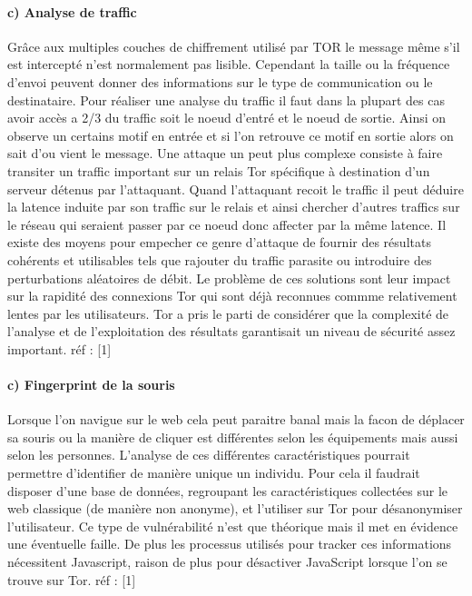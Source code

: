 \documentclass[]{article}
\let\oldparagraph\paragraph
\renewcommand{\paragraph}[1]{\oldparagraph{#1}\mbox{}}
\begin{document}
\paragraph{c) Analyse de traffic}\label{c-analyse-de-traffic}

Grâce aux multiples couches de chiffrement utilisé par TOR le message
même s'il est intercepté n'est normalement pas lisible. Cependant la
taille ou la fréquence d'envoi peuvent donner des informations sur le
type de communication ou le destinataire. Pour réaliser une analyse du
traffic il faut dans la plupart des cas avoir accès a 2/3 du traffic
soit le noeud d'entré et le noeud de sortie. Ainsi on observe un
certains motif en entrée et si l'on retrouve ce motif en sortie alors on
sait d'ou vient le message. Une attaque un peut plus complexe consiste à
faire transiter un traffic important sur un relais Tor spécifique à
destination d'un serveur détenus par l'attaquant. Quand l'attaquant
recoit le traffic il peut déduire la latence induite par son traffic sur
le relais et ainsi chercher d'autres traffics sur le réseau qui seraient
passer par ce noeud donc affecter par la même latence. Il existe des
moyens pour empecher ce genre d'attaque de fournir des résultats
cohérents et utilisables tels que rajouter du traffic parasite ou
introduire des perturbations aléatoires de débit. Le problème de ces
solutions sont leur impact sur la rapidité des connexions Tor qui sont
déjà reconnues commme relativement lentes par les utilisateurs. Tor a
pris le parti de considérer que la complexité de l'analyse et de
l'exploitation des résultats garantisait un niveau de sécurité assez
important. réf : {[}1{]}

\paragraph{c) Fingerprint de la
souris}\label{c-fingerprint-de-la-souris}

Lorsque l'on navigue sur le web cela peut paraitre banal mais la facon
de déplacer sa souris ou la manière de cliquer est différentes selon les
équipements mais aussi selon les personnes. L'analyse de ces différentes
caractéristiques pourrait permettre d'identifier de manière unique un
individu. Pour cela il faudrait disposer d'une base de données,
regroupant les caractéristiques collectées sur le web classique (de
manière non anonyme), et l'utiliser sur Tor pour désanonymiser
l'utilisateur. Ce type de vulnérabilité n'est que théorique mais il met
en évidence une éventuelle faille. De plus les processus utilisés pour
tracker ces informations nécessitent Javascript, raison de plus pour
désactiver JavaScript lorsque l'on se trouve sur Tor. réf : {[}1{]}
\end{document}
